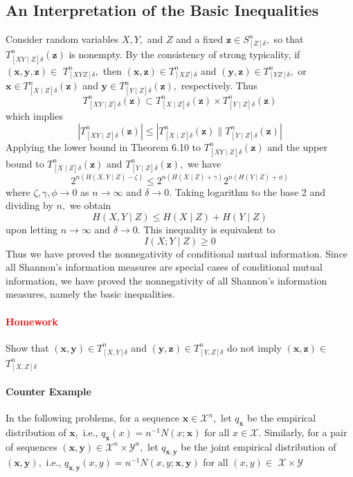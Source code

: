 \documentclass[8pt]{article}
\begin{document}
\subsection{An Interpretation of the Basic Inequalities}
Consider random variables $X, Y,$ and $Z$ and a fixed $\mathbf{z} \in S_{[Z] \delta}^{n},$ so that $T_{[X Y \mid Z] \delta}^{n}(\mathbf{z})$ is nonempty. By the consistency of strong typicality, if $(\mathbf{x}, \mathbf{y}, \mathbf{z}) \in$ $T_{[X Y Z] \delta}^{n},$ then $(\mathbf{x}, \mathbf{z}) \in T_{[X Z] \delta}^{n}$ and $(\mathbf{y}, \mathbf{z}) \in T_{[Y Z] \delta}^{n},$ or $\mathbf{x} \in T_{[X \mid Z] \delta}^{n}(\mathbf{z})$ and
$\mathbf{y} \in T_{[Y \mid Z] \delta}^{n}(\mathbf{z}),$ respectively. Thus
$$
T_{[X Y \mid Z] \delta}^{n}(\mathbf{z}) \subset T_{[X \mid Z] \delta}^{n}(\mathbf{z}) \times T_{[Y \mid Z] \delta}^{n}(\mathbf{z})
$$
which implies
$$
\left|T_{[X Y \mid Z] \delta}^{n}(\mathbf{z})\right| \leq\left|T_{[X \mid Z] \delta}^{n}(\mathbf{z}) \| T_{[Y \mid Z] \delta}^{n}(\mathbf{z})\right|
$$
Applying the lower bound in Theorem 6.10 to $T_{[X Y \mid Z] \delta}^{n}(\mathbf{z})$ and the upper bound to $T_{[X \mid Z] \delta}^{n}(\mathbf{z})$ and $T_{[Y \mid Z] \delta}^{n}(\mathbf{z}),$ we have
$$
2^{n(H(X, Y \mid Z)-\zeta)} \leq 2^{n(H(X \mid Z)+\gamma)} 2^{n(H(Y \mid Z)+\phi)}
$$
where $\zeta, \gamma, \phi \rightarrow 0$ as $n \rightarrow \infty$ and $\delta \rightarrow 0 .$ Taking logarithm to the base 2 and dividing by $n,$ we obtain
$$
H(X, Y \mid Z) \leq H(X \mid Z)+H(Y \mid Z)
$$
upon letting $n \rightarrow \infty$ and $\delta \rightarrow 0 .$ This inequality is equivalent to
$$
I(X ; Y \mid Z) \geq 0
$$
Thus we have proved the nonnegativity of conditional mutual information.
Since all Shannon’s information measures are special cases of conditional mutual information, we have proved the nonnegativity of all Shannon’s information measures, namely the basic inequalities.


\newpage

\paragraph{\textcolor{red}{Homework}}
Show that $(\mathbf{x}, \mathbf{y}) \in T_{[X, Y] \delta}^{n}$ and $(\mathbf{y}, \mathbf{z}) \in T_{[Y, Z] \delta}^{n}$ do not imply $(\mathbf{x}, \mathbf{z}) \in$
$T_{[X, Z] \delta}^{n}$
\paragraph{Counter Example}
In the following problems, for a sequence $\mathbf{x} \in \mathcal{X}^{n},$ let $q_{\mathbf{x}}$ be the empirical distribution of $\mathbf{x},$ i.e., $q_{\mathbf{x}}(x)=n^{-1} N(x ; \mathbf{x})$ for all $x \in \mathcal{X}$. Similarly, for a pair of sequences $(\mathbf{x}, \mathbf{y}) \in \mathcal{X}^{n} \times \mathcal{Y}^{n},$ let $q_{\mathbf{x}, \mathbf{y}}$ be the joint empirical distribution of $(\mathbf{x}, \mathbf{y}),$ i.e., $q_{\mathbf{x}, \mathbf{y}}(x, y)=n^{-1} N(x, y ; \mathbf{x}, \mathbf{y})$ for all $(x, y) \in$
$\mathcal{X} \times \mathcal{Y}$
\end{document}
